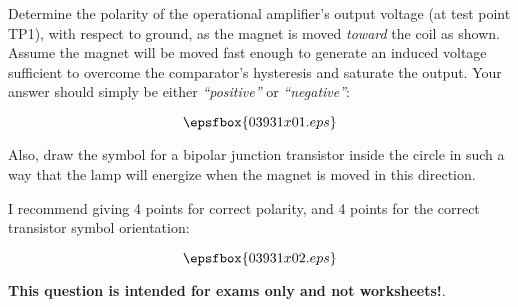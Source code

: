 

Determine the polarity of the operational amplifier's output voltage (at test point TP1), with respect to ground, as the magnet is moved {\it toward} the coil as shown.  Assume the magnet will be moved fast enough to generate an induced voltage sufficient to overcome the comparator's hysteresis and saturate the output.  Your answer should simply be either {\it ``positive''} or {\it ``negative''}:

$$\epsfbox{03931x01.eps}$$

Also, draw the symbol for a bipolar junction transistor inside the circle in such a way that the lamp will energize when the magnet is moved in this direction.







I recommend giving 4 points for correct polarity, and 4 points for the correct transistor symbol orientation:

$$\epsfbox{03931x02.eps}$$







{\bf This question is intended for exams only and not worksheets!}.




